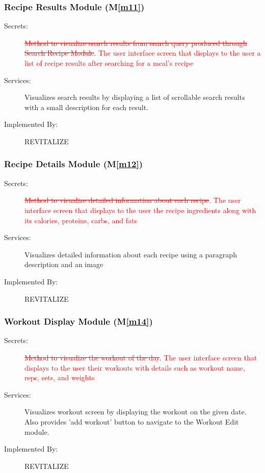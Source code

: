 \documentclass[12pt, titlepage]{article}
\newcommand{\mref}[1]{M\ref{#1}}
\begin{document}
\subsubsection{Recipe Results Module (\mref{m11})}
\begin{description}
	\item[Secrets:]\textcolor{red}{\sout{Method to visualize search results from search query produced through Search Recipe Module}}\textcolor{red}{. The user interface screen that displays to the user a list of recipe results after searching for a meal's recipe}
	\item[Services:]Visualizes search results by displaying a list of scrollable search results with a small description for each result.
	\item[Implemented By:] REVITALIZE
\end{description}

\subsubsection{Recipe Details Module (\mref{m12})}
\begin{description}
	\item[Secrets:]\textcolor{red}{\sout{Method to visualize detailed information about each recipe}}\textcolor{red}{. The user interface screen that displays to the user the recipe ingredients along with its calories, proteins, carbs, and fats}
	\item[Services:]Visualizes detailed information about each recipe using a paragraph description and an image
	\item[Implemented By:] REVITALIZE
\end{description}

\subsubsection{Workout Display Module (\mref{m14})}
\begin{description}
	\item[Secrets:]\textcolor{red}{\sout{Method to visualize the workout of the day}}\textcolor{red}{. The user interface screen that displays to the user their workouts with details such as workout name, reps, sets, and weights}
	\item[Services:]Visualizes workout screen by displaying the workout on the given date. Also provides 'add workout' button to navigate to the Workout Edit module.
	\item[Implemented By:] REVITALIZE
\end{description}
\end{document}
